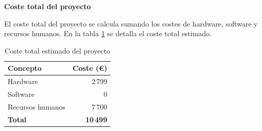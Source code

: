 \textbf{Coste total del proyecto}

El coste total del proyecto se calcula sumando los costes de hardware, software y recursos humanos. En la tabla \ref{tab:coste-total} se detalla el coste total estimado.

\begin{table}[!ht]
    \centering
    \begin{tabular}{|l|r|}
        \hline
        \textbf{Concepto} & \textbf{Coste (€)} \\
        \hline
        Hardware          & 2\,799             \\
        Software          & 0                  \\
        Recursos humanos  & 7\,700             \\
        \hline
        \textbf{Total}    & \textbf{10\,499}   \\
        \hline
    \end{tabular}
    \caption{Coste total estimado del proyecto}
    \label{tab:coste-total}
\end{table}
